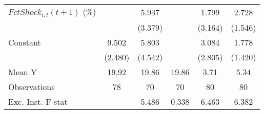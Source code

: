 {\begin{tabular}{l*{5}{c}}
\addlinespace
$ FctShock_{i,t}(t+1)$ (\%)&                     &       5.937         &                     &       1.799         &       2.728         \\
                    &                     &     (3.379)         &                     &     (3.164)         &     (1.546)         \\
\addlinespace
Constant            &       9.502\sym{***}&       5.803         &                     &       3.084         &       1.778         \\
                    &     (2.480)         &     (4.542)         &                     &     (2.805)         &     (1.420)         \\
\midrule
Mean Y              &       19.92         &       19.86         &       19.86         &        3.71         &        5.34         \\
Observations        &          78         &          70         &          70         &          80         &          80         \\
Exc. Inst. F-stat   &                     &       5.486         &       0.338         &       6.463         &       6.382         \\
\bottomrule
\end{tabular}
}
